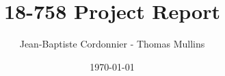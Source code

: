 \documentclass{article}
\begin{document}
\title{18-758 Project Report}
\author{Jean-Baptiste Cordonnier - Thomas Mullins}
\date{\today}
\maketitle


\end{document}
